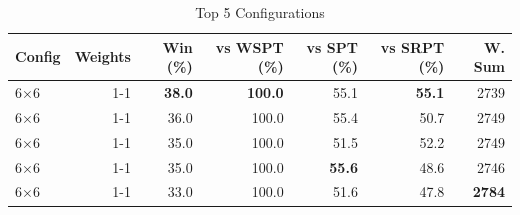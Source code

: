\begin{table}[htbp]%
\centering%
\begin{tabular}{lrrrrrr}%
\toprule%
\textbf{Config}&\textbf{Weights}&\textbf{Win (\%)}&\textbf{vs WSPT (\%)}&\textbf{vs SPT (\%)}&\textbf{vs SRPT (\%)}&\textbf{W. Sum}\\%
\midrule%
6×6&1-1&\textbf{38.0}&\textbf{100.0}&55.1&\textbf{55.1}&2739\\%
6×6&1-1&36.0&100.0&55.4&50.7&2749\\%
6×6&1-1&35.0&100.0&51.5&52.2&2749\\%
6×6&1-1&35.0&100.0&\textbf{55.6}&48.6&2746\\%
6×6&1-1&33.0&100.0&51.6&47.8&\textbf{2784}\\%
\bottomrule%
\end{tabular}%
\caption{Top 5 Configurations}%
\label{tab:summary}%
\end{table}